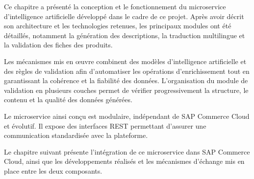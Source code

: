 Ce chapitre a présenté la conception et le fonctionnement du microservice d'intelligence artificielle développé dans le cadre de ce projet. Après avoir décrit son architecture et les technologies retenues, les principaux modules ont été détaillés, notamment la génération des descriptions, la traduction multilingue et la validation des fiches des produits.

Les mécanismes mis en œuvre combinent des modèles d'intelligence artificielle et des règles de validation afin d'automatiser les opérations d'enrichissement tout en garantissant la cohérence et la fiabilité des données. L'organisation du module de validation en plusieurs couches permet de vérifier progressivement la structure, le contenu et la qualité des données générées.

Le microservice ainsi conçu est modulaire, indépendant de SAP Commerce Cloud et évolutif. Il expose des interfaces REST permettant d'assurer une communication standardisée avec la plateforme.

Le chapitre suivant présente l'intégration de ce microservice dans SAP Commerce Cloud, ainsi que les développements réalisés et les mécanismes d'échange mis en place entre les deux composants.


